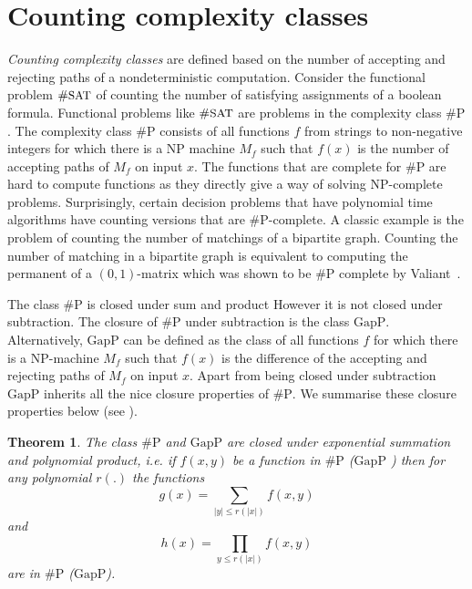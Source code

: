 \documentclass[11pt]{madras}%
\newtheorem{theorem}{Theorem}[chapter]
\theoremstyle{remark}
\newcommand{\length}[1]{{\ensuremath{\left|#1\right|}}}
\newcommand{\ProblemFont}[1]{{\ensuremath{\textrm{\small #1}}}}
\begin{document}
\section{Counting complexity classes}

\emph{Counting complexity classes} are defined based on the number of
accepting and rejecting paths of a nondeterministic computation.
Consider the functional problem $\# \ProblemFont{SAT}$ of counting the
number of satisfying assignments of a boolean formula. Functional
problems like $\# \ProblemFont{SAT}$ are problems in the complexity
class $\# \mathrm{P}$. The complexity class $\# \mathrm{P}$ consists
of all functions $f$ {from} strings to non-negative integers for which
there is a $\mathrm{NP}$ machine $M_f$ such that $f(x)$ is the number
of accepting paths of $M_f$ on input $x$.  The functions that are
complete for $\# \mathrm{P}$ are hard to compute functions as they
directly give a way of solving $\mathrm{NP}$-complete problems.
Surprisingly, certain decision problems that have polynomial time
algorithms have counting versions that are $\# \mathrm{P}$-complete. A
classic example is the problem of counting the number of matchings of
a bipartite graph.  Counting the number of matching in a bipartite
graph is equivalent to computing the permanent of a $(0,1)$-matrix
which was shown to be $\# \mathrm{P}$ complete by
Valiant~\cite{valiant79permanent}.

The class $\# \mathrm{P}$ is closed under sum and product However it
is not closed under subtraction.  The closure of $\# \mathrm{P}$ under
subtraction is the class $\mathrm{GapP}$.  Alternatively,
$\mathrm{GapP}$ can be defined as the class of all functions $f$ for
which there is a $\mathrm{NP}$-machine $M_f$ such that $f(x)$ is the
difference of the accepting and rejecting paths of $M_f$ on input $x$.
Apart from being closed under subtraction $\mathrm{GapP}$ inherits all
the nice closure properties of $\# \mathrm{P}$. We summarise these
closure properties below (see \cite{fenner91gapdefinable}).

\begin{theorem} The class $\# \mathrm{P}$ and $\mathrm{GapP}$ are
  closed under exponential summation and polynomial product, i.e. if
  $f(x,y)$ be a function in $\# \mathrm{P}$ ($\mathrm{GapP}$ ) then
  for any polynomial $r(.)$ the functions 
   \[ 
   g(x) = \sum_{\length{y} \leq r(\length{x}) } f(x,y)
   \] and
   \[
   h(x) = \prod_{y \leq r(\length{x})} f(x,y) 
   \] are in $\# \mathrm{P}$ ($\mathrm{GapP}$).
\end{theorem}
\end{document}
